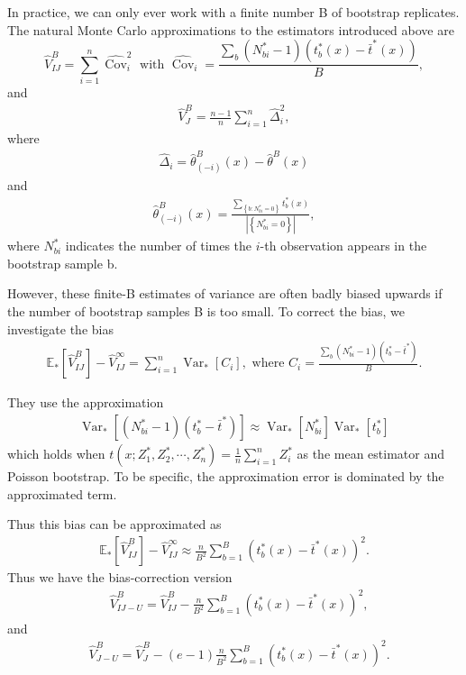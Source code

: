 \documentclass[11pt]{article}
\begin{document}
In practice, we can only ever work with a finite number B of bootstrap replicates. The natural Monte Carlo approximations to the estimators introduced above are
$$
\widehat{V}_{I J}^{B}=\sum_{i=1}^{n} \widehat{\operatorname{Cov}}_{i}^{2} \text { with } \widehat{\operatorname{Cov}}_{i}=\frac{\sum_{b}\left(N_{b i}^{*}-1\right)\left(t_{b}^{*}(x)-\bar{t}^{*}(x)\right)}{B},
$$
and
\begin{align*}
\widehat{V}_{J}^{B}=\frac{n-1}{n} \sum_{i=1}^{n} \hat{\Delta}_{i}^{2}, 
\end{align*}
where 
\begin{align*}
	\hat{\Delta}_{i}=\hat{\theta}_{(-i)}^{B}(x)-\hat{\theta}^{B}(x)
\end{align*}
and 
\begin{align*}	
\hat{\theta}_{(-i)}^{B}(x)=\frac{\sum_{\left\{b: N_{b i}^{*}=0\right\}} t_{b}^{*}(x)}{\left|\left\{N_{b i}^{*}=0\right\}\right|},
\end{align*}
where $N_{bi}^{*}$ indicates the number of times the $i$-th observation appears in the bootstrap sample b.

However, these finite-B estimates of variance are often badly biased upwards
if the number of bootstrap samples B is too small. 
To correct the bias, we investigate the bias \begin{align*}
	\mathbb{E}_{*}\left[\widehat{V}_{I J}^{B}\right]-\widehat{V}_{I J}^{\infty}=\sum_{i=1}^{n} \operatorname{Var}_{*}\left[C_{i}\right], \text { where } C_{i}=\frac{\sum_{b}\left(N_{b i}^{*}-1\right)\left(t_{b}^{*}-\bar{t}^{*}\right)}{B}.
\end{align*}

They use the approximation \begin{align*}
	\operatorname{Var}_{*}\left[\left(N_{b i}^{*}-1\right)\left(t_{b}^{*}-\bar{t}^{*}\right)\right] \approx \operatorname{Var}_{*}\left[N_{b i}^{*}\right] \operatorname{Var}_{*}\left[t_{b}^{*}\right]
\end{align*}
which holds when $t(x;Z_1^{*},Z_2^{*},\cdots,Z_n^{*})=\frac{1}{n}\sum_{i=1}^nZ_i^{*}$ as the mean estimator and Poisson bootstrap.
To be specific, the approximation error is dominated by the approximated term.

Thus this bias can be approximated as \begin{align*}
	\mathbb{E}_{*}\left[\widehat{V}_{I J}^{B}\right]-\widehat{V}_{I J}^{\infty}\approx \frac{n}{B^{2}} \sum_{b=1}^{B}\left(t_{b}^{*}(x)-\bar{t}^{*}(x)\right)^{2}.
\end{align*}
Thus we have the bias-correction version
\begin{align*}
&\widehat{V}_{I J-U}^{B}=\widehat{V}_{I J}^{B}-\frac{n}{B^{2}} \sum_{b=1}^{B}\left(t_{b}^{*}(x)-\bar{t}^{*}(x)\right)^{2}, 
\end{align*}
and 
\begin{align*}
&\widehat{V}_{J-U}^{B}=\widehat{V}_{J}^{B}-(e-1) \frac{n}{B^{2}} \sum_{b=1}^{B}\left(t_{b}^{*}(x)-\bar{t}^{*}(x)\right)^{2}.
\end{align*}
		
\end{document}
